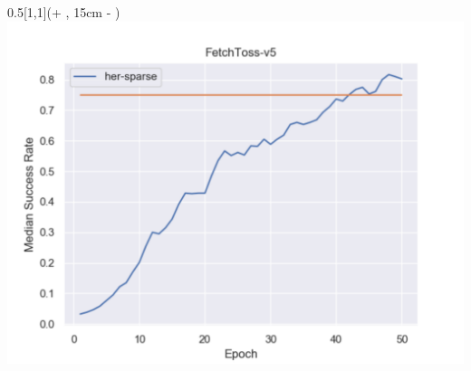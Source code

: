 \begin{frame}
	\begin{textblock*}{0.5\paperwidth}[1,1](\textwidth + \PraesentationSeitenrand, 15cm - \PraesentationSeitenrand)%
		\includegraphics[width=0.5\paperwidth]{./Ressourcen/Figures/fig_FetchToss-v5.pdf}
		
		
	\end{textblock*}

	
\end{frame}
\clearpage








